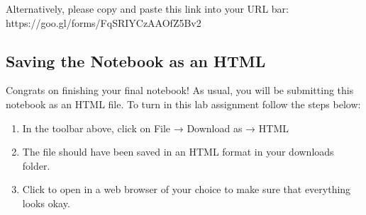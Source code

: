 \documentclass[11pt]{article}
\providecommand{\tightlist}{%
      \setlength{\itemsep}{0pt}\setlength{\parskip}{0pt}}
\begin{document}
Alternatively, please copy and paste this link into your URL bar:
https://goo.gl/forms/FqSRIYCzAAOfZ5Bv2

    \subsection{Saving the Notebook as an
HTML}\label{saving-the-notebook-as-an-html}

Congrats on finishing your final notebook! As usual, you will be
submitting this notebook as an HTML file. To turn in this lab assignment
follow the steps below:

\begin{enumerate}
\def\labelenumi{\arabic{enumi}.}
\tightlist
\item
  In the toolbar above, click on File → Download as → HTML
\item
  The file should have been saved in an HTML format in your downloads
  folder.
\item
  Click to open in a web browser of your choice to make sure that
  everything looks okay.
\end{enumerate}


    
    
    
    
\end{document}
